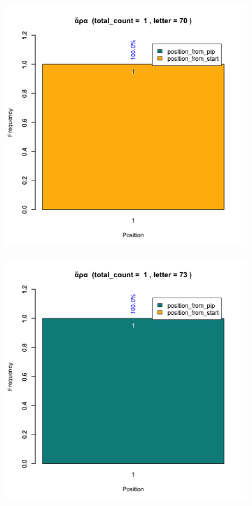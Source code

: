 \documentclass[a4paper]{article}
\begin{document}
\begin{figure}
\begin{subfigure}{0.45\textwidth}
\end{subfigure}
\begin{subfigure}{0.45\textwidth}
\centering
\includegraphics[width=1\linewidth]{../../data/output/paul_R_par/plots/par13_lt70.png}
\end{subfigure}
\begin{subfigure}{0.45\textwidth}
\centering
\includegraphics[width=1\linewidth]{../../data/output/paul_R_par/plots/par13_lt73.png}
\end{subfigure}
\end{figure}
\end{document}
